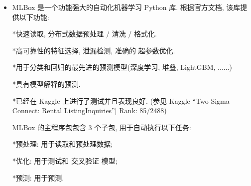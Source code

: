 \begin{itemize}
\item MLBox 是一个功能强大的自动化机器学习 Python 库. 根据官方文档, 该库提供以下功能:
	
*快速读取, 分布式数据预处理 / 清洗 / 格式化.
	
*高可靠性的特征选择, 泄漏检测, 准确的 超参数优化.

*用于分类和回归的最先进的预测模型(深度学习, 堆叠, LightGBM, ......)

*具有模型解释的预测.

*已经在 Kaggle 上进行了测试并且表现良好. (参见 Kaggle “Two Sigma Connect: Rental ListingInquiries”| Rank: 85/2488)


MLBox 的主程序包包含 3 个子包, 用于自动执行以下任务:

*预处理: 用于读取和预处理数据;

*优化:  用于测试和 交叉验证 模型;

*预测:  用于预测.


\end{itemize}
